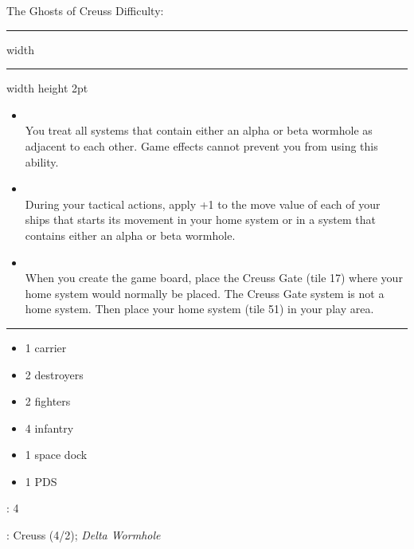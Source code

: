 {\handel\Huge The Ghosts of Creuss} \hfill {\Large Difficulty: \hard} \vspace{-4pt}\\
\hrule width \hsize \kern 1mm \hrule width \hsize height 2pt


\begin{multicols}{2}


\begin{itemize}
\item {}\\
You treat all systems that contain either an alpha or beta wormhole as adjacent to each other. Game effects cannot prevent you from using this ability.
\item {}\\
During your tactical actions, apply +1 to the move value of each of your ships that starts its movement in your home system or in a system that contains either an alpha or beta wormhole.
\item {}\\
When you create the game board, place the Creuss Gate (tile 17) where your home system would normally be placed. The Creuss Gate system is not a home system. Then place your home system (tile 51) in your play area.
\end{itemize}


\vspace{-10pt}\rule{\hsize}{0.4pt}\vspace{5pt}


\vspace{-5pt}
\begin{multicols}{2}
\begin{itemize}
\item 1 carrier
\item 2 destroyers
\item 2 fighters
\item 4 infantry
\item 1 space dock
\color{white}
\item 1 PDS
\color{black}
\end{itemize}
\end{multicols}

\vspace{-5pt}
: 4

\vspace{2pt}
: Creuss (4/2); \emph{Delta Wormhole}


\end{multicols}
